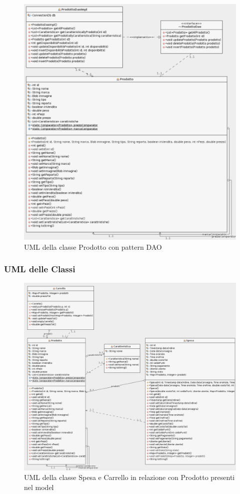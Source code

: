 \documentclass{article}
\begin{document}
\begin{figure}[h!]
	\centering
	\includegraphics[width=\textwidth]{UmlProdotto.png}
	\caption{UML della classe Prodotto con pattern DAO}
	\label{fig:UmlProdotto}
\end{figure}
\clearpage
\subsubsection{UML delle Classi}
\begin{figure}[h!]
	\centering
	\includegraphics[width=\textwidth]{UmlSpesa.png}
	\caption{UML della classe Spesa e Carrello in relazione con Prodotto presenti nel model}
	\label{fig:UmlSpesa}
\end{figure}
\end{document}
